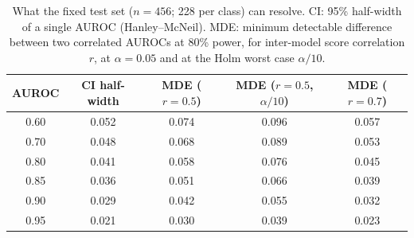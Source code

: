 \begin{table}[t]
\centering
\small
\caption{What the fixed test set ($n=456$; 228 per class) can resolve. CI: 95\% half-width of a single AUROC (Hanley--McNeil). MDE: minimum detectable difference between two correlated AUROCs at 80\% power, for inter-model score correlation $r$, at $\alpha=0.05$ and at the Holm worst case $\alpha/10$.}
\label{tab:power}
\begin{tabular}{ccccc}
\toprule
AUROC & CI half-width & MDE ($r{=}0.5$) & MDE ($r{=}0.5$, $\alpha/10$) & MDE ($r{=}0.7$)\\
\midrule
0.60 & 0.052 & 0.074 & 0.096 & 0.057 \\
0.70 & 0.048 & 0.068 & 0.089 & 0.053 \\
0.80 & 0.041 & 0.058 & 0.076 & 0.045 \\
0.85 & 0.036 & 0.051 & 0.066 & 0.039 \\
0.90 & 0.029 & 0.042 & 0.055 & 0.032 \\
0.95 & 0.021 & 0.030 & 0.039 & 0.023 \\
\bottomrule
\end{tabular}
\end{table}
